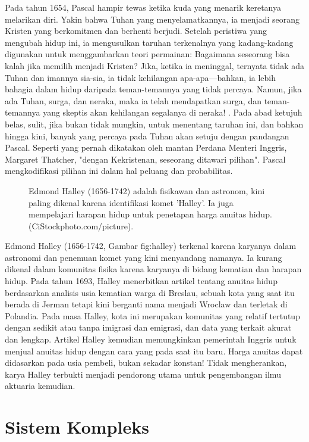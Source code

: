 \documentclass[a4paper,12pt]{book}
\begin{document}
Pada tahun 1654, Pascal hampir tewas ketika kuda yang menarik keretanya melarikan diri. Yakin bahwa Tuhan yang menyelamatkannya, ia menjadi seorang Kristen yang berkomitmen dan berhenti berjudi. Setelah peristiwa yang mengubah hidup ini, ia mengusulkan taruhan terkenalnya yang kadang-kadang digunakan untuk menggambarkan teori permainan: Bagaimana seseorang bisa kalah jika memilih menjadi Kristen? Jika, ketika ia meninggal, ternyata tidak ada Tuhan dan imannya sia-sia, ia tidak kehilangan apa-apa—bahkan, ia lebih bahagia dalam hidup daripada teman-temannya yang tidak percaya. Namun, jika ada Tuhan, surga, dan neraka, maka ia telah mendapatkan surga, dan teman-temannya yang skeptis akan kehilangan segalanya di neraka! \cite{morris1982}. Pada abad ketujuh belas, sulit, jika bukan tidak mungkin, untuk menentang taruhan ini, dan bahkan hingga kini, banyak yang percaya pada Tuhan akan setuju dengan pandangan Pascal. Seperti yang pernah dikatakan oleh mantan Perdana Menteri Inggris, Margaret Thatcher, "dengan Kekristenan, seseorang ditawari pilihan". Pascal mengkodifikasi pilihan ini dalam hal peluang dan probabilitas.

\begin{figure}[h]
\centering
\caption{Edmond Halley (1656-1742) adalah fisikawan dan astronom, kini paling dikenal karena identifikasi komet 'Halley'. Ia juga mempelajari harapan hidup untuk penetapan harga anuitas hidup. (CiStockphoto.com/picture).}
\label{fig:halley}
\end{figure}

Edmond Halley (1656-1742, Gambar  {fig:halley}) terkenal karena karyanya dalam astronomi dan penemuan komet yang kini menyandang namanya. Ia kurang dikenal dalam komunitas fisika karena karyanya di bidang kematian dan harapan hidup. Pada tahun 1693, Halley menerbitkan artikel tentang anuitas hidup berdasarkan analisis usia kematian warga di Breslau, sebuah kota yang saat itu berada di Jerman tetapi kini berganti nama menjadi Wroclaw dan terletak di Polandia. Pada masa Halley, kota ini merupakan komunitas yang relatif tertutup dengan sedikit atau tanpa imigrasi dan emigrasi, dan data yang terkait akurat dan lengkap. Artikel Halley \cite{halley1693} kemudian memungkinkan pemerintah Inggris untuk menjual anuitas hidup dengan cara yang pada saat itu baru. Harga anuitas dapat didasarkan pada usia pembeli, bukan sekadar konstan! Tidak mengherankan, karya Halley terbukti menjadi pendorong utama untuk pengembangan ilmu aktuaria kemudian.

\section{Sistem Kompleks}
\label{sec:1.2}
\end{document}
